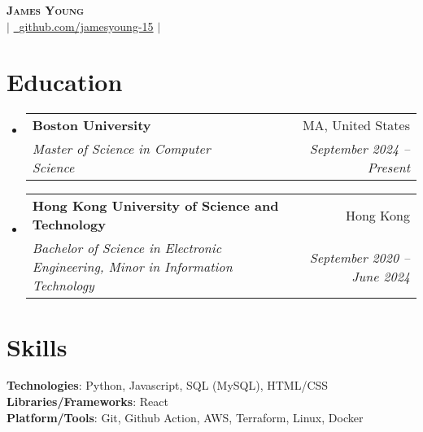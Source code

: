 \documentclass[letterpaper,11pt]{article}
\makeatletter
\newcommand{\resumeItem}[1]{
  \item\small{
    {#1 \vspace{-2pt}}
  }
}
\newcommand{\resumeSubheading}[4]{
  \vspace{-2pt}\item
    \begin{tabular*}{0.97\textwidth}[t]{l@{\extracolsep{\fill}}r}
      \textbf{#1} & #2 \\
      \textit{\small#3} & \textit{\small #4} \\
    \end{tabular*}\vspace{-7pt}
}
\newcommand{\resumeSubHeadingListStart}{\begin{itemize}[leftmargin=0.08in, label={}]}
\newcommand{\resumeSubHeadingListEnd}{\end{itemize}}
\newcommand{\resumeItemListStart}{\begin{itemize}[leftmargin=0.22in]}
\newcommand{\resumeItemListEnd}{\end{itemize}\vspace{-5pt}}
\makeatother
\begin{document}
\begin{center}
    \textbf{\Huge \scshape James Young} \\ \vspace{1pt}
    \small 
    \href{mailto:jamesyoung3931@gmail.com}{} $|$ 
    \href{https://github.com/jamesyoung-15} {\faGithub\ {github.com/jamesyoung-15}} $|$
    \href{https://jyyoung.com}{} %
\end{center}


\section{Education}
  \resumeSubHeadingListStart
    \resumeSubheading
        {Boston University}{MA, United States}
        {Master of Science in Computer Science}{September 2024 -- Present}
    \resumeSubheading
        {Hong Kong University of Science and Technology}{Hong Kong}
        {Bachelor of Science in Electronic Engineering, Minor in Information Technology}{September 2020 -- June 2024}
  \resumeSubHeadingListEnd

\section{Skills}
 \begin{itemize}[leftmargin=0.08in, label={}]
    \small{\item{
     \textbf{Technologies}{: Python, Javascript, SQL (MySQL), HTML/CSS} \\
     \textbf{Libraries/Frameworks}{: React } \\
     \textbf{Platform/Tools}{: Git, Github Action, AWS, Terraform, Linux, Docker} \\
    }}
 \end{itemize}

\end{document}

